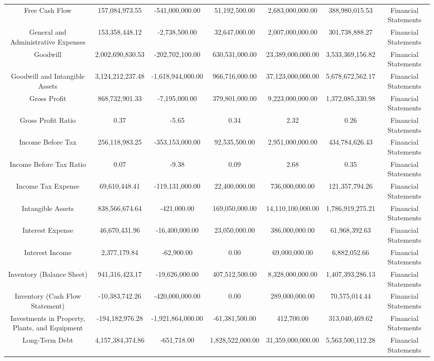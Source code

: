 \begin{longtable}{ccccccc}
Free Cash Flow & 157,084,973.55 & -541,000,000.00 & 51,192,500.00 & 2,683,000,000.00 & 388,980,015.53 & Financial Statements \\
General and Administrative Expenses & 153,358,448.12 & -2,738,500.00 & 32,647,000.00 & 2,007,000,000.00 & 301,738,888.27 & Financial Statements \\
Goodwill & 2,002,690,830.53 & -202,702,100.00 & 630,531,000.00 & 23,389,000,000.00 & 3,533,369,156.82 & Financial Statements \\
Goodwill and Intangible Assets & 3,124,212,237.48 & -1,618,944,000.00 & 966,716,000.00 & 37,123,000,000.00 & 5,678,672,562.17 & Financial Statements \\
Gross Profit & 868,732,901.33 & -7,195,000.00 & 379,801,000.00 & 9,223,000,000.00 & 1,372,085,330.98 & Financial Statements \\
Gross Profit Ratio & 0.37 & -5.65 & 0.34 & 2.32 & 0.26 & Financial Statements \\
Income Before Tax & 256,118,983.25 & -353,153,000.00 & 92,535,500.00 & 2,951,000,000.00 & 434,784,626.43 & Financial Statements \\
Income Before Tax Ratio & 0.07 & -9.38 & 0.09 & 2.68 & 0.35 & Financial Statements \\
Income Tax Expense & 69,610,448.41 & -119,131,000.00 & 22,400,000.00 & 736,000,000.00 & 121,357,794.26 & Financial Statements \\
Intangible Assets & 838,566,674.64 & -421,000.00 & 169,050,000.00 & 14,110,100,000.00 & 1,786,919,275.21 & Financial Statements \\
Interest Expense & 46,670,431.96 & -16,400,000.00 & 23,050,000.00 & 386,000,000.00 & 61,968,392.63 & Financial Statements \\
Interest Income & 2,377,179.84 & -62,900.00 & 0.00 & 69,000,000.00 & 6,882,052.66 & Financial Statements \\
Inventory (Balance Sheet) & 941,316,423.17 & -19,626,000.00 & 407,512,500.00 & 8,328,000,000.00 & 1,407,393,286.13 & Financial Statements \\
Inventory (Cash Flow Statement) & -10,383,742.26 & -420,000,000.00 & 0.00 & 289,000,000.00 & 70,575,014.44 & Financial Statements \\
Investments in Property, Plants, and Equipment & -194,182,976.28 & -1,921,864,000.00 & -61,381,500.00 & 412,700.00 & 313,040,469.62 & Financial Statements \\
Long-Term Debt & 4,157,384,374.86 & -651,718.00 & 1,828,522,000.00 & 31,359,000,000.00 & 5,563,500,112.28 & Financial Statements \\

\end{longtable}
